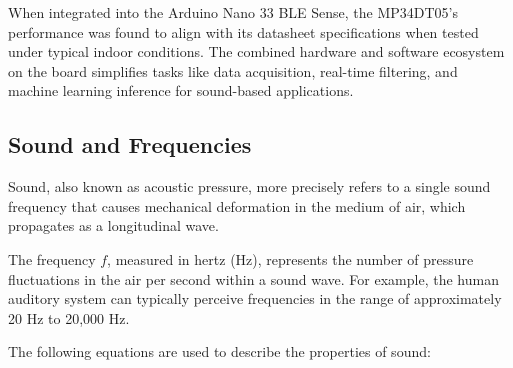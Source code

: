 \bigskip
When integrated into the Arduino Nano 33 BLE Sense, the MP34DT05’s performance was found to align with its datasheet specifications when tested under typical indoor conditions. The combined hardware and software ecosystem on the board simplifies tasks like data acquisition, real-time filtering, and machine learning inference for sound-based applications.


\subsection{Sound and Frequencies}\label{Sound and Frequencies}

Sound, also known as acoustic pressure, more precisely refers to a single sound frequency that causes mechanical deformation in the medium of air, which propagates as a longitudinal wave.

The frequency $f$, measured in hertz (Hz), represents the number of pressure fluctuations in the air per second within a sound wave. For example, the human auditory system can typically perceive frequencies in the range of approximately 20 Hz to 20,000 Hz.

The following equations are used to describe the properties of sound:

\bigskip
\begin{center}    
	
\end{center}

\bigskip



